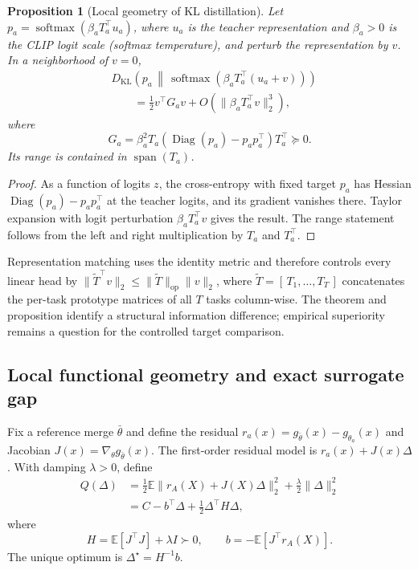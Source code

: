 \documentclass[letterpaper]{article} %
\theoremstyle{plain}
\newtheorem{proposition}[theorem]{Proposition}
\theoremstyle{definition}
\begin{document}
\begin{proposition}[Local geometry of KL distillation]
\label{prop:kl-geometry}
Let $p_a=\operatorname{softmax}(\beta_aT_a^\top u_a)$, where $u_a$ is the teacher representation and $\beta_a>0$ is the CLIP logit scale (softmax temperature), and perturb the representation by $v$.
In a neighborhood of $v=0$,
\begin{align}
&D_{\mathrm{KL}}\!\left(
 p_a\,\middle\|\,
 \operatorname{softmax}(\beta_aT_a^\top(u_a+v))
 \right) \\
&\qquad=
\frac12 v^\top G_a v
+O\!\left(\|\beta_aT_a^\top v\|_2^3\right),
\label{eq:kl-expansion}
\end{align}
where
\begin{equation}
G_a=\beta_a^2T_a
\left(\operatorname{Diag}(p_a)-p_ap_a^\top\right)T_a^\top\succeq0.
\label{eq:kl-metric}
\end{equation}
Its range is contained in $\operatorname{span}(T_a)$.
\end{proposition}

\begin{proof}
As a function of logits $z$, the cross-entropy with fixed target $p_a$ has Hessian $\operatorname{Diag}(p_a)-p_ap_a^\top$ at the teacher logits, and its gradient vanishes there.
Taylor expansion with logit perturbation $\beta_aT_a^\top v$ gives the result.
The range statement follows from the left and right multiplication by $T_a$ and $T_a^\top$.
\end{proof}

Representation matching uses the identity metric and therefore controls every linear head by $\|\widetilde T^\top v\|_2\le\|\widetilde T\|_{\mathrm{op}}\|v\|_2$, where $\widetilde T=[\,T_1,\dots,T_T\,]$ concatenates the per-task prototype matrices of all $T$ tasks column-wise.
The theorem and proposition identify a structural information difference; empirical superiority remains a question for the controlled target comparison.

\subsection{Local functional geometry and exact surrogate gap}
\label{app:local-gap}

Fix a reference merge $\bar\theta$ and define the residual $r_a(x)=g_{\bar\theta}(x)-g_{\theta_a}(x)$ and Jacobian $J(x)=\nabla_\theta g_{\bar\theta}(x)$.
The first-order residual model is $r_a(x)+J(x)\Delta$.
With damping $\lambda>0$, define
\begin{align}
Q(\Delta)
&=\frac12\mathbb E\|r_A(X)+J(X)\Delta\|_2^2
  +\frac\lambda2\|\Delta\|_2^2 \\
&=C-b^\top\Delta+\frac12\Delta^\top H\Delta,
\label{eq:Q-def}
\end{align}
where
\begin{equation}
H=\mathbb E[J^\top J]+\lambda I\succ0,
\qquad
b=-\mathbb E[J^\top r_A(X)].
\label{eq:H-b}
\end{equation}
The unique optimum is $\Delta^\star=H^{-1}b$.
\end{document}

